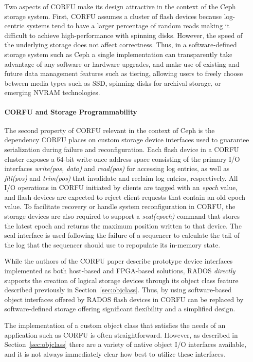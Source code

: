 \documentclass[10pt,twocolumn]{article}
\begin{document}
Two aspects of CORFU make its design attractive in the context of the Ceph
storage system. First, CORFU assumes a cluster of flash devices because
log-centric systems tend to have a larger percentage of random reads making it
difficult to achieve high-performance with spinning disks. However, the speed
of the underlying storage does not affect correctness. Thus, in a
software-defined storage system such as Ceph a single implementation can
transparently take advantage of any software or hardware upgrades, and make use
of existing and future data management features such as tiering,
allowing users to freely choose between media types such as SSD, spinning
disks for archival storage, or emerging NVRAM technologies.

\paragraph*{CORFU and Storage Programmability}
The second property of CORFU relevant in the context of Ceph is the dependency
CORFU places on custom storage device interfaces used to guarantee
serialization during failure and reconfiguration. Each flash device in a CORFU
cluster exposes a 64-bit write-once address space consisting of the primary I/O
interfaces \emph{write(pos, data)} and \emph{read(pos)} for accessing log
entries, as well as \emph{fill(pos)} and \emph{trim(pos)} that invalidate and
reclaim log entries, respectively. All I/O operations in CORFU initiated by
clients are tagged with an \emph{epoch} value, and flash devices are expected
to reject client requests that contain an old epoch value. To facilitate
recovery or handle system reconfiguration in CORFU, the storage devices are
also required to support a \emph{seal(epoch)} command that stores the latest
epoch and returns the maximum position written to that device. The seal
interface is used following the failure of a sequencer to calculate the tail of
the log that the sequencer should use to repopulate its in-memory state.

While the authors of the CORFU paper describe prototype device interfaces
implemented as both host-based and FPGA-based solutions, RADOS \emph{directly} supports
the creation of logical storage devices through its object class feature
described previously in Section~\ref{sec:objclass}. Thus, by using
software-based object interfaces offered by RADOS flash devices in CORFU can be
replaced by software-defined storage offering significant flexibility and a
simplified design.

The implementation of a custom object class that satisfies the needs of an
application such as CORFU is often straightforward. However, as described in
Section~\ref{sec:objclass} there are a variety of native object I/O interfaces
available, and it is not always immediately clear how best to utilize these
interfaces.
\end{document}
